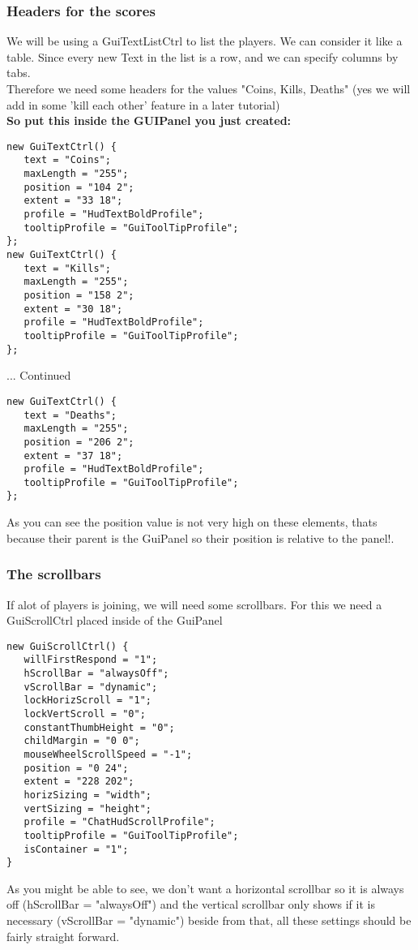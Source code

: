 \begin{frame}[fragile]
\frametitle{Headers for the scores}
We will be using a GuiTextListCtrl to list the players. We can consider it like a table. Since every new Text in the list is a row, and we can specify columns by tabs.\\
Therefore we need some headers for the values "Coins, Kills, Deaths" (yes we will add in some 'kill each other' feature in a later tutorial)\\
{\bf So put this inside the GUIPanel you just created:}
\TS
\begin{lstlisting}
new GuiTextCtrl() {
   text = "Coins";
   maxLength = "255";
   position = "104 2";
   extent = "33 18";
   profile = "HudTextBoldProfile";
   tooltipProfile = "GuiToolTipProfile";
};
new GuiTextCtrl() {
   text = "Kills";
   maxLength = "255";
   position = "158 2";
   extent = "30 18";
   profile = "HudTextBoldProfile";
   tooltipProfile = "GuiToolTipProfile";
};
\end{lstlisting}
... Continued
\end{frame}

\begin{frame}[fragile]
\TS
\begin{lstlisting}
new GuiTextCtrl() {
   text = "Deaths";
   maxLength = "255";
   position = "206 2";
   extent = "37 18";
   profile = "HudTextBoldProfile";
   tooltipProfile = "GuiToolTipProfile";
};
\end{lstlisting}
As you can see the position value is not very high on these elements, thats because their parent is the GuiPanel so their position is relative to the panel!.
\end{frame}

\begin{frame}[fragile]
\frametitle{The scrollbars}
If alot of players is joining, we will need some scrollbars. For this we need a GuiScrollCtrl placed inside of the GuiPanel\\
\TS
\begin{lstlisting}
new GuiScrollCtrl() {
   willFirstRespond = "1";
   hScrollBar = "alwaysOff";
   vScrollBar = "dynamic";
   lockHorizScroll = "1";
   lockVertScroll = "0";
   constantThumbHeight = "0";
   childMargin = "0 0";
   mouseWheelScrollSpeed = "-1";
   position = "0 24";
   extent = "228 202";
   horizSizing = "width";
   vertSizing = "height";
   profile = "ChatHudScrollProfile";
   tooltipProfile = "GuiToolTipProfile";
   isContainer = "1";
}
\end{lstlisting}
As you might be able to see, we don't want a horizontal scrollbar so it is always off (hScrollBar = "alwaysOff") and the vertical scrollbar only shows if it is necessary
(vScrollBar = "dynamic") beside from that, all these settings should be fairly straight forward.
\end{frame}

